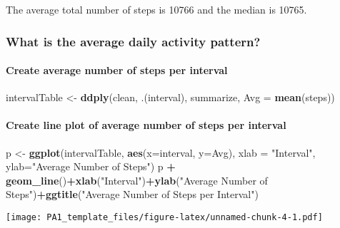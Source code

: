 \documentclass[]{article}
\newenvironment{Shaded}{\begin{snugshade}}{\end{snugshade}}
\newcommand{\KeywordTok}[1]{\textcolor[rgb]{0.13,0.29,0.53}{\textbf{#1}}}
\newcommand{\DataTypeTok}[1]{\textcolor[rgb]{0.13,0.29,0.53}{#1}}
\newcommand{\DecValTok}[1]{\textcolor[rgb]{0.00,0.00,0.81}{#1}}
\newcommand{\StringTok}[1]{\textcolor[rgb]{0.31,0.60,0.02}{#1}}
\newcommand{\OperatorTok}[1]{\textcolor[rgb]{0.81,0.36,0.00}{\textbf{#1}}}
\newcommand{\NormalTok}[1]{#1}
\let\oldparagraph\paragraph
\renewcommand{\paragraph}[1]{\oldparagraph{#1}\mbox{}}
\begin{document}
The average total number of steps is 10766 and the median is 10765.

\subsubsection{What is the average daily activity
pattern?}\label{what-is-the-average-daily-activity-pattern}

\paragraph{Create average number of steps per
interval}\label{create-average-number-of-steps-per-interval}

\begin{Shaded}
\begin{Highlighting}[]
\NormalTok{intervalTable <-}\StringTok{ }\KeywordTok{ddply}\NormalTok{(clean, .(interval), summarize, }\DataTypeTok{Avg =} \KeywordTok{mean}\NormalTok{(steps))}
\end{Highlighting}
\end{Shaded}

\paragraph{Create line plot of average number of steps per
interval}\label{create-line-plot-of-average-number-of-steps-per-interval}

\begin{Shaded}
\begin{Highlighting}[]
\NormalTok{p <-}\StringTok{ }\KeywordTok{ggplot}\NormalTok{(intervalTable, }\KeywordTok{aes}\NormalTok{(}\DataTypeTok{x=}\NormalTok{interval, }\DataTypeTok{y=}\NormalTok{Avg), }\DataTypeTok{xlab =} \StringTok{"Interval"}\NormalTok{, }\DataTypeTok{ylab=}\StringTok{"Average Number of Steps"}\NormalTok{)}
\NormalTok{p }\OperatorTok{+}\StringTok{ }\KeywordTok{geom_line}\NormalTok{()}\OperatorTok{+}\KeywordTok{xlab}\NormalTok{(}\StringTok{"Interval"}\NormalTok{)}\OperatorTok{+}\KeywordTok{ylab}\NormalTok{(}\StringTok{"Average Number of Steps"}\NormalTok{)}\OperatorTok{+}\KeywordTok{ggtitle}\NormalTok{(}\StringTok{"Average Number of Steps per Interval"}\NormalTok{)}
\end{Highlighting}
\end{Shaded}

\texttt{[image: PA1\_template\_files/figure-latex/unnamed-chunk-4-1.pdf]}

\begin{Shaded}
\end{Shaded}
\end{document}

